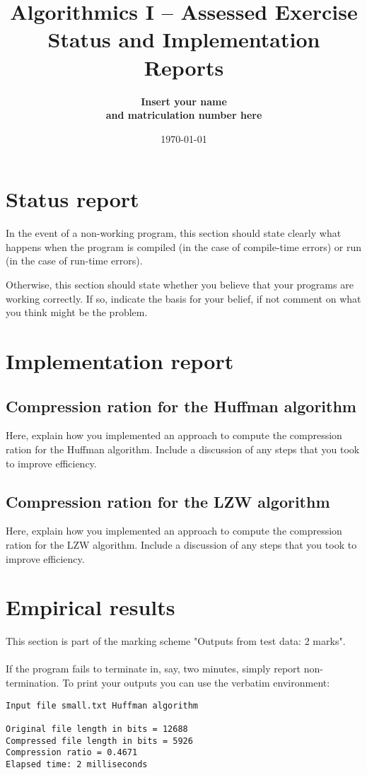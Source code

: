 \documentclass[]{article}
\title{Algorithmics I -- Assessed Exercise\\ \vspace{4mm} 
Status and Implementation Reports}
\author{\bf Insert your name\\ \bf and matriculation number here}
\date{\today}
\begin{document}
\maketitle

\section*{Status report}

In the event of a non-working program, this section should state clearly what happens when the program is compiled (in the case of compile-time errors) or run (in the case of run-time errors).  

Otherwise, this section should state whether you believe that your programs are working correctly. If so, indicate the basis for your belief, if not comment on what you think might be the problem.

\section*{Implementation report}

\subsection*{Compression ration for the Huffman algorithm}

Here, explain how you implemented an approach to compute the compression ration for the Huffman algorithm. Include a discussion of any steps that you took to improve efficiency.

\subsection*{Compression ration for the LZW algorithm}

Here, explain how you implemented an approach to compute the compression ration for the LZW algorithm. Include a discussion of any steps that you took to improve efficiency.


\section*{Empirical results}

This section is part of the marking scheme "Outputs from test data: 2 marks".
\\ \\
If the program fails to terminate in, say, two minutes, simply report non-termination. To print your outputs you can use the verbatim environment:

\begin{verbatim}
Input file small.txt Huffman algorithm

Original file length in bits = 12688
Compressed file length in bits = 5926
Compression ratio = 0.4671
Elapsed time: 2 milliseconds
\end{verbatim}
\end{document}
